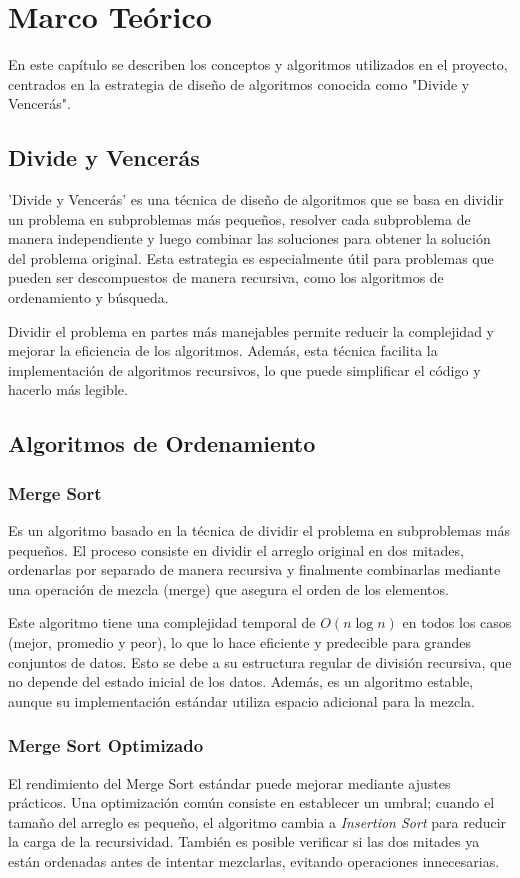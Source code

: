 \chapter{Marco Teórico}

En este capítulo se describen los conceptos y algoritmos utilizados en el proyecto, centrados en la estrategia de diseño de algoritmos conocida como "Divide y Vencerás".

\section{Divide y Vencerás}
'Divide y Vencerás' es una técnica de diseño de algoritmos que se basa en dividir un problema en subproblemas más pequeños, resolver cada subproblema de manera independiente y luego combinar las soluciones para obtener la solución del problema original. Esta estrategia es especialmente útil para problemas que pueden ser descompuestos de manera recursiva, como los algoritmos de ordenamiento y búsqueda.

Dividir el problema en partes más manejables permite reducir la complejidad y mejorar la eficiencia de los algoritmos. Además, esta técnica facilita la implementación de algoritmos recursivos, lo que puede simplificar el código y hacerlo más legible.

\section{Algoritmos de Ordenamiento}

\subsection{Merge Sort}
Es un algoritmo basado en la técnica de dividir el problema en subproblemas más pequeños. El proceso consiste en dividir el arreglo original en dos mitades, ordenarlas por separado de manera recursiva y finalmente combinarlas mediante una operación de mezcla (merge) que asegura el orden de los elementos.

Este algoritmo tiene una complejidad temporal de \(O(n \log n)\) en todos los casos (mejor, promedio y peor), lo que lo hace eficiente y predecible para grandes conjuntos de datos. Esto se debe a su estructura regular de división recursiva, que no depende del estado inicial de los datos. Además, es un algoritmo estable, aunque su implementación estándar utiliza espacio adicional para la mezcla.

\subsection{Merge Sort Optimizado}
El rendimiento del Merge Sort estándar puede mejorar mediante ajustes prácticos. Una optimización común consiste en establecer un umbral; cuando el tamaño del arreglo es pequeño, el algoritmo cambia a \textit{Insertion Sort} para reducir la carga de la recursividad. También es posible verificar si las dos mitades ya están ordenadas antes de intentar mezclarlas, evitando operaciones innecesarias.

